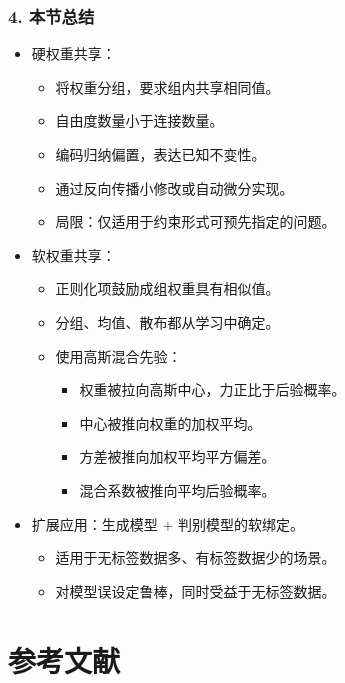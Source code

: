 \documentclass[t,aspectratio=169]{beamer} %
\begin{document}
\begin{frame}
    \frametitle{4. 本节总结}
    \begin{itemize}
        \item \alert{硬权重共享}：
        \begin{itemize}
            \item 将权重分组，要求组内共享相同值。
            \item 自由度数量小于连接数量。
            \item 编码归纳偏置，表达已知不变性。
            \item 通过反向传播小修改或自动微分实现。
            \item 局限：仅适用于约束形式可预先指定的问题。
        \end{itemize}
        \item \alert{软权重共享}：
        \begin{itemize}
            \item 正则化项鼓励成组权重具有相似值。
            \item 分组、均值、散布都从学习中确定。
            \item 使用\alert{高斯混合先验}：
            \begin{itemize}
                \item 权重被拉向高斯中心，力正比于后验概率。
                \item 中心被推向权重的加权平均。
                \item 方差被推向加权平均平方偏差。
                \item 混合系数被推向平均后验概率。
            \end{itemize}
        \end{itemize}
        \item \alert{扩展应用}：生成模型 + 判别模型的软绑定。
        \begin{itemize}
            \item 适用于无标签数据多、有标签数据少的场景。
            \item 对模型误设定鲁棒，同时受益于无标签数据。
        \end{itemize}
    \end{itemize}
\end{frame}

\section{参考文献}
\end{document}
